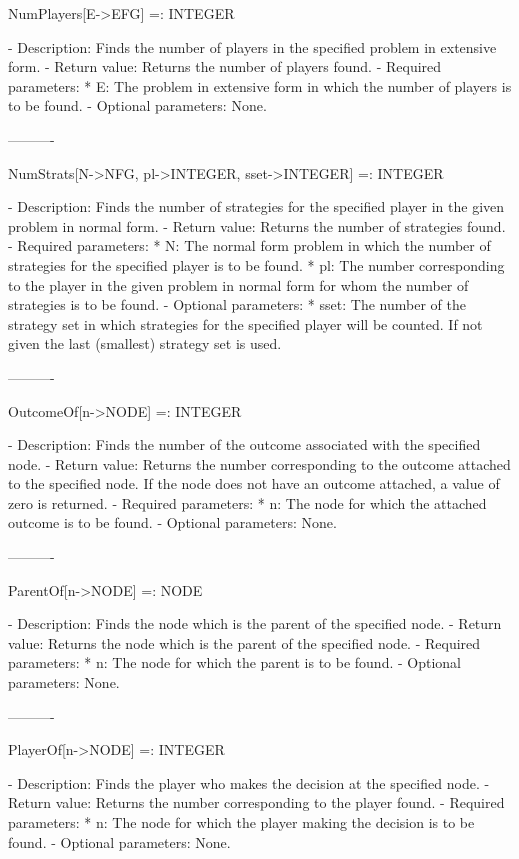 \begin{itemize}
NumPlayers[E->EFG] =: INTEGER

   -	Description:  Finds the number of players in the specified problem in
	extensive form.
   -	Return value:  Returns the number of players found.
   -	Required parameters:
	  *  E:  The problem in extensive form in which the number of players
		is to be found.
   -	Optional parameters:  None.

----------

NumStrats[N->NFG, pl->INTEGER, {sset->INTEGER}] =: INTEGER

   -	Description:  Finds the number of strategies for the specified player 
	in the given problem in normal form.
   -	Return value:  Returns the number of strategies found.
   -	Required parameters:
	  *  N:  The normal form problem in which the number of strategies for
		the specified player is to be found.
	  *  pl:  The number corresponding to the player in the given problem 
		in normal form for whom the number of strategies is to be
		found.
   -	Optional parameters:
	  *  sset:  The number of the strategy set in which strategies for the
		specified player will be counted.  If not given the last
		(smallest) strategy set is used.

----------

OutcomeOf[n->NODE] =: INTEGER

   -	Description:  Finds the number of the outcome associated with the 
	specified node.
   -	Return value:  Returns the number corresponding to the outcome attached
	to the specified node.  If the node does not have an outcome attached,
	a value of zero is returned.
   -	Required parameters:
	  *  n:  The node for which the attached outcome is to be found.
   -	Optional parameters:  None.

----------

ParentOf[n->NODE] =: NODE

   -	Description:  Finds the node which is the parent of the specified node.
   -	Return value:  Returns the node which is the parent of the specified
	node.
   -	Required parameters:
	  *  n:  The node for which the parent is to be found.
   -	Optional parameters:  None.

----------

PlayerOf[n->NODE] =: INTEGER

   -	Description:  Finds the player who makes the decision at the specified
	node.
   -	Return value:  Returns the number corresponding to the player found.
   -	Required parameters:
	  *  n:  The node for which the player making the decision is to be
		found.
   -	Optional parameters:  None.


\end{itemize}
